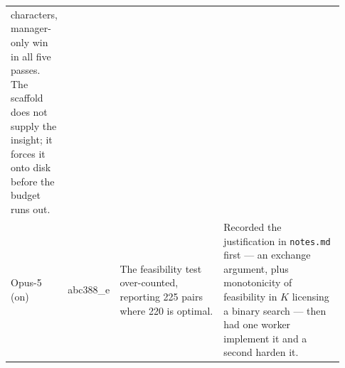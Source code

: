 \documentclass{article}
\begin{document}
\begin{table}[p]
\begin{tabular}{@{}p{0.155\linewidth}p{0.101\linewidth}p{0.310\linewidth}p{0.364\linewidth}@{}}
characters, manager-only win in all five passes. The scaffold does not supply the insight; it forces
it onto disk before the budget runs out. \\
\addlinespace
Opus-5 \newline (on) & abc388\_e & The feasibility test over-counted, reporting 225 pairs where 220
is optimal. & Recorded the justification in \texttt{notes.md} first --- an exchange argument,
plus monotonicity of feasibility in $K$ licensing a binary search --- then had one worker implement
it and a second harden it. \\
\bottomrule
\end{tabular}
\end{table}








\end{document}

